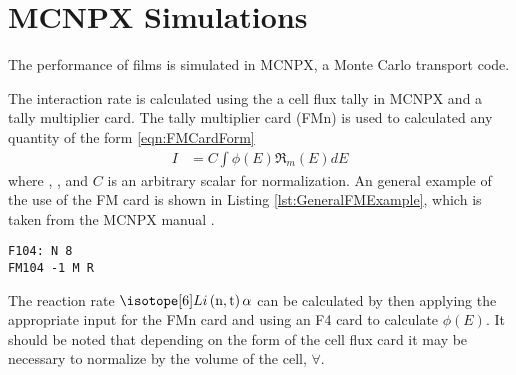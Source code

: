 \chapter{MCNPX Simulations}
The performance of films is simulated in MCNPX, a Monte Carlo transport code\cite{pelowitz_mcnpx_2006}.

The interaction rate is calculated using the a cell flux tally in MCNPX and a tally multiplier card.
The tally multiplier card (FMn) is used to calculated any quantity of the form \eqref{eqn:FMCardForm} \cite{pelowitz_mcnpx_2006}
\begin{align}
  \label{eqn:FMCardForm}
  I &= C\int\phi(E)\Re_m(E)dE
\end{align}
where ,  ,  and $C$ is an arbitrary scalar for normalization.
An general example of the use of the FM card is shown in Listing \ref{lst:GeneralFMExample}, which is taken from the MCNPX manual \cite{pelowitz_mcnpx_2006}.
\begin{lstlisting}[caption={[Example usage of the FM card]Example usage of the FM card to calculate the number of reactions per \si{\cm\cubed} of type R in cell 8 of material M. The normalization is by atomic density, signified by the -1},label={lst:GeneralFMExample}]
F104: N 8
FM104 -1 M R
\end{lstlisting}

The reaction rate $\iso[6]{Li}\left(\text{n},\text{t}\right)\alpha$ can be calculated by then applying the appropriate input for the FMn card and using an F4 card to calculate $\phi(E)$.
It should be noted that depending on the form of the cell flux card it may be necessary to normalize by the volume of the cell, $\forall$.

